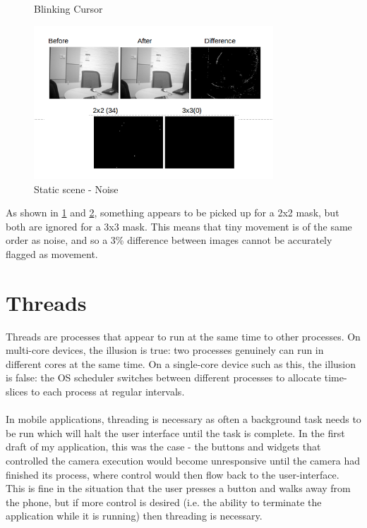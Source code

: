 \documentclass[11pt]{article} %
\begin{document}
{{\begin{figure}[H]
\begin{center}
	\end{center}
	\vspace{-20pt}
	\caption{Blinking Cursor}
	\label{img:curse1}
\end{figure}
\begin{figure}[H]
	\begin{center}
		\includegraphics[width=0.8\textwidth]{../images/ImageOps/CURSOR2}
	\end{center}
	\vspace{-20pt}
	\caption{Static scene - Noise}
	\label{fig:curse2}
\end{figure}

As shown in \cref{img:curse1} and \cref{fig:curse2}, something appears to be picked up for a 2x2 mask, but both are ignored for a 3x3 mask. This means that tiny movement is of the same order as noise, and so a 3\% difference between images cannot be accurately flagged as movement.

\section{Threads}
Threads are processes that appear to run at the same time to other processes. On multi-core devices, the illusion is true: two processes genuinely can run in different cores at the same time. On a single-core device such as this, the illusion is false: the OS scheduler switches between different processes to allocate time-slices to each process at regular intervals.\\
\\In mobile applications, threading is necessary as often a background task needs to be run which will halt the user interface until the task is complete. In the first draft of my application, this was the case - the buttons and widgets that controlled the camera execution would become unresponsive until the camera had finished its process, where control would then flow back to the user-interface.
\\This is fine in the situation that the user presses a button and walks away from the phone, but if more control is desired (i.e. the ability to terminate the application while it is running) then threading is necessary.

}}
\end{document}
